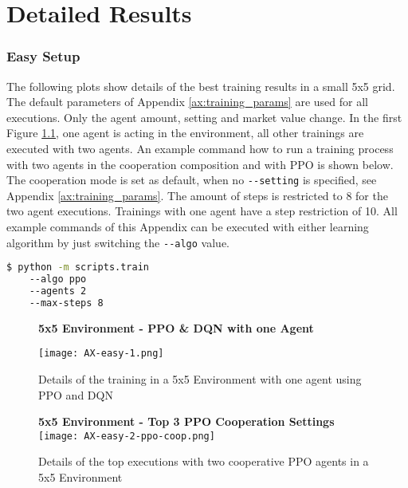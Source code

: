 \chapter{Detailed Results}\label{ax:plots}

\subsection{Easy Setup}
The following plots show details of the best training results in a small 5x5 grid. The default parameters of Appendix \ref{ax:training_params} are used for all executions. Only the agent amount, setting and market value change. In the first Figure \ref{fig:ax-easy-1}, one agent is acting in the environment, all other trainings are executed with two agents. An example command how to run a training process with two agents in the cooperation composition and with PPO is shown below. The cooperation mode is set as default, when no \verb|--setting| is specified, see Appendix \ref{ax:training_params}. The amount of steps is restricted to 8 for the two agent executions. Trainings with one agent have a step restriction of 10. All example commands of this Appendix can be executed with either learning algorithm by just switching the \verb|--algo| value. 

\begin{lstlisting}[float=htp,caption=Exemplary command to execute training with two PPO agents in a easy setup,label=lst:easy_command,language=bash ,xleftmargin=3ex,xrightmargin=1ex]
$ python -m scripts.train
    --algo ppo
    --agents 2
    --max-steps 8 
\end{lstlisting}

\newpage
\vfill
\begin{figure}
    \centering
    \textbf{5x5 Environment - PPO \& DQN with one Agent}\par\medskip
    \texttt{[image: AX-easy-1.png]}\\
    \caption[PPO and DQN Training Details with One Agent in a 5x5 Environment]{Details of the training in a 5x5 Environment with one agent using PPO and DQN}\label{fig:ax-easy-1}
\end{figure}
\vfill
\clearpage

\newpage
\vfill
\begin{figure}
    \centering
    \textbf{5x5 Environment - Top 3 PPO Cooperation Settings}
    \texttt{[image: AX-easy-2-ppo-coop.png]}\\
    \caption[Training Details of Top PPO Cooperation Executions in a 5x5 Environment]{Details of the top executions with two cooperative PPO agents in a 5x5 Environment}\label{fig:ax-easy-2-ppo-coop}
\end{figure}
\vfill
\clearpage

